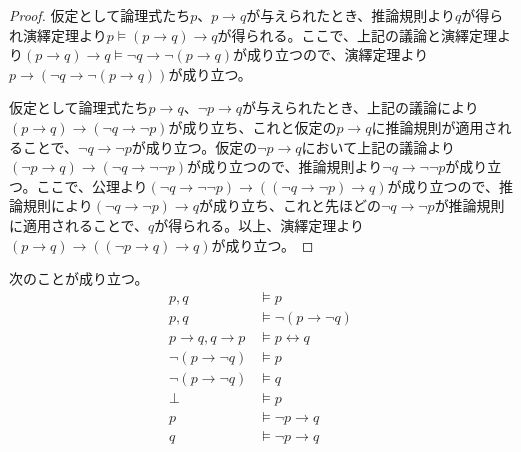 \documentclass[a4paper]{jsarticle}
\begin{document}
\begin{proof}
仮定として論理式たち$p$、$p \rightarrow q$が与えられたとき、推論規則より$q$が得られ演繹定理より$p \vDash (p \rightarrow q) \rightarrow q$が得られる。ここで、上記の議論と演繹定理より$(p \rightarrow q) \rightarrow q \vDash \neg q \rightarrow \neg(p \rightarrow q)$が成り立つので、演繹定理より$p \rightarrow \left( \neg q \rightarrow \neg(p \rightarrow q) \right)$が成り立つ。\par
仮定として論理式たち$p \rightarrow q$、$\neg p \rightarrow q$が与えられたとき、上記の議論により$(p \rightarrow q) \rightarrow (\neg q \rightarrow \neg p)$が成り立ち、これと仮定の$p \rightarrow q$に推論規則が適用されることで、$\neg q \rightarrow \neg p$が成り立つ。仮定の$\neg p \rightarrow q$において上記の議論より$(\neg p \rightarrow q) \rightarrow (\neg q \rightarrow \neg\neg p)$が成り立つので、推論規則より$\neg q \rightarrow \neg\neg p$が成り立つ。ここで、公理より$(\neg q \rightarrow \neg\neg p) \rightarrow \left( (\neg q \rightarrow \neg p) \rightarrow q \right)$が成り立つので、推論規則により$(\neg q \rightarrow \neg p) \rightarrow q$が成り立ち、これと先ほどの$\neg q \rightarrow \neg p$が推論規則に適用されることで、$q$が得られる。以上、演繹定理より$(p \rightarrow q) \rightarrow \left( (\neg p \rightarrow q) \rightarrow q \right)$が成り立つ。
\end{proof}
\begin{thm}
\label{1.1.1.5}
次のことが成り立つ。
\begin{align*}
p,q &\vDash p\\
p,q &\vDash \neg(p \rightarrow \neg q)\\
p \rightarrow q,q \rightarrow p &\vDash p \leftrightarrow q\\
\neg(p \rightarrow \neg q) &\vDash p\\
\neg(p \rightarrow \neg q) &\vDash q\\
\bot &\vDash p\\
p &\vDash \neg p \rightarrow q\\
q &\vDash \neg p \rightarrow q
\end{align*}
\end{thm}
\end{document}
